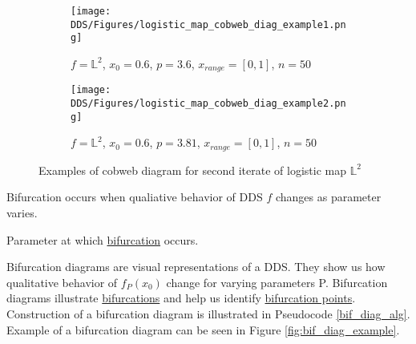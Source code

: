 
\begin{figure}[!h]
    \centering
    \begin{subfigure}{0.495\textwidth}
        \centering
        \texttt{[image: DDS/Figures/logistic\_map\_cobweb\_diag\_example1.png]}
        \caption{$f = \mathbb{L}^2$, $x_0 = 0.6$, $p = 3.6$, $x_{range} = [0, 1]$, $n = 50$}
    \end{subfigure}
    \hfill
    \begin{subfigure}{0.495\textwidth}
        \centering
        \texttt{[image: DDS/Figures/logistic\_map\_cobweb\_diag\_example2.png]}
        \caption{$f = \mathbb{L}^2$, $x_0 = 0.6$, $p = 3.81$, $x_{range} = [0, 1]$, $n = 50$}
    \end{subfigure}

    \caption{Examples of cobweb diagram for second iterate of logistic map $\mathbb{L}^2$}
    \label{fig:cobweb_diag_example}
\end{figure}

\label{def:bifurcation}
\begin{definition}[Bifurcation]
    Bifurcation occurs when qualiative behavior of DDS $f$ changes as parameter varies.
\end{definition}

\label{def:bifurcation_point}
\begin{definition}
    Parameter at which \hyperref[def:bifurcation]{bifurcation} occurs.
\end{definition}


\label{def: bif_diag} 
\begin{remark}
    Bifurcation diagrams are visual representations of a DDS.
    They show us how qualitative behavior of $f_P(x_0)$ change for varying parameters P.
    Bifurcation diagrams illustrate \hyperref[def:bifurcation]{bifurcations} and help us identify \hyperref[def:bifurcation_point]{bifurcation points}.
    Construction of a bifurcation diagram is illustrated in Pseudocode \ref{bif_diag_alg}.
    Example of a bifurcation diagram can be seen in Figure \ref{fig:bif_diag_example}.
\end{remark}

